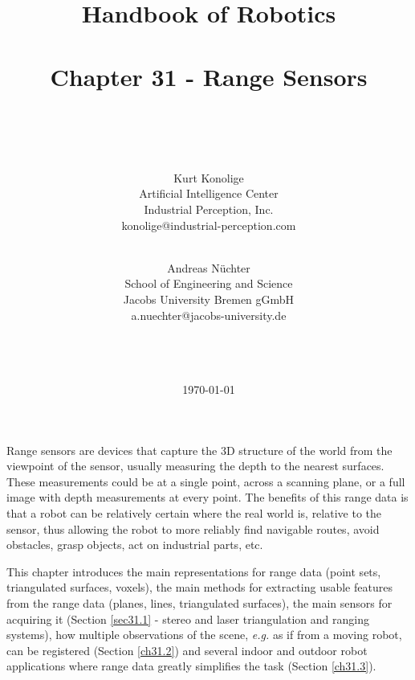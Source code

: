\documentclass[twocolumn,oneside]{book}
\begin{document}
\title{\LARGE{Handbook of Robotics\\
~\\
Chapter 31 - Range Sensors}\\
~\\
~}

\author{ %
Kurt Konolige\\
Artificial Intelligence Center\\
Industrial Perception, Inc.\\
konolige@industrial-perception.com\\
\and\\
Andreas N{\"u}chter\\
School of Engineering and Science \\
Jacobs University Bremen gGmbH \\
a.nuechter@jacobs-university.de \\
\\
\\
\\
}

\date{\today}

\maketitle


\tableofcontents


\setcounter{page}{1}

\setcounter{chapter}{31}

Range sensors are devices that capture the 3D structure of the world
from the viewpoint of the sensor, usually measuring the depth to the
nearest surfaces. These measurements could be at a single point,
across a scanning plane, or a full image with depth measurements at
every point.
The benefits of this range data is that a robot can be relatively 
certain where the real world is, relative to the sensor, thus allowing
the robot to more reliably find navigable routes, avoid obstacles,
grasp objects, act on industrial parts, etc.

This chapter introduces the main representations for range data 
(point sets, triangulated surfaces, voxels), the main methods 
for extracting usable features from the range data (planes, lines, triangulated surfaces),
the main sensors for acquiring it (Section \ref{sec31.1} -
stereo and laser triangulation and ranging systems),
how multiple observations of the scene, {\it e.g.} as if from a 
moving robot, can be registered (Section \ref{ch31.2})
and several indoor and outdoor robot applications where
range data greatly simplifies the task (Section \ref{ch31.3}).
\end{document}
